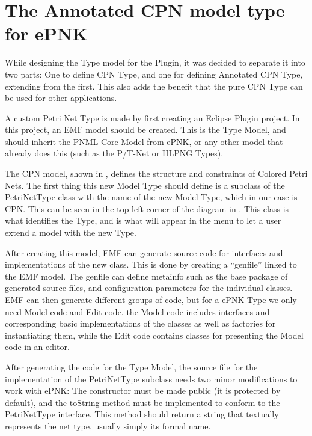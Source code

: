 
\section{The Annotated CPN model type for ePNK}
While designing the Type model for the Plugin, it was decided to separate it
into two parts: One to define CPN Type, and one for defining Annotated CPN Type,
extending from the first. This also adds the benefit that the pure CPN Type can
be used for other applications.

A custom Petri Net Type is made by first creating an Eclipse Plugin project. 
In this project, an EMF model should be created. This is the Type Model, and
should inherit the PNML Core Model from ePNK, or any other model that already
does this (such as the P/T-Net or HLPNG Types). 

The CPN model, shown in , defines the structure and
constraints of Colored Petri Nets. The first thing this new Model Type should
define is a subclass of the PetriNetType class with the name of the new Model
Type, which in our case is CPN. This can be seen in the top left corner of the
diagram in . This class is what identifies the Type,
and is what will appear in the menu to let a user extend a model with the new
Type.

After creating this model, EMF can generate source code for interfaces and
implementations of the new class. This is done by creating a ``genfile''
linked to the EMF model. The genfile can define metainfo such as the base
package of generated source files, and configuration parameters for the
individual classes. EMF can then generate different groups of code, but for a
ePNK Type we only need Model code and Edit code. the Model code includes
interfaces and corresponding basic implementations of the classes as well as
factories for instantiating them, while the Edit code contains classes for
presenting the Model code in an editor.

After generating the code for the Type Model, the source file for
the implementation of the PetriNetType subclass needs two minor modifications
to work with ePNK: The constructor must be made public (it is protected by
default), and the toString method must be implemented to conform to the
PetriNetType interface. This method should return a string that textually
represents the net type, usually simply its formal name.

